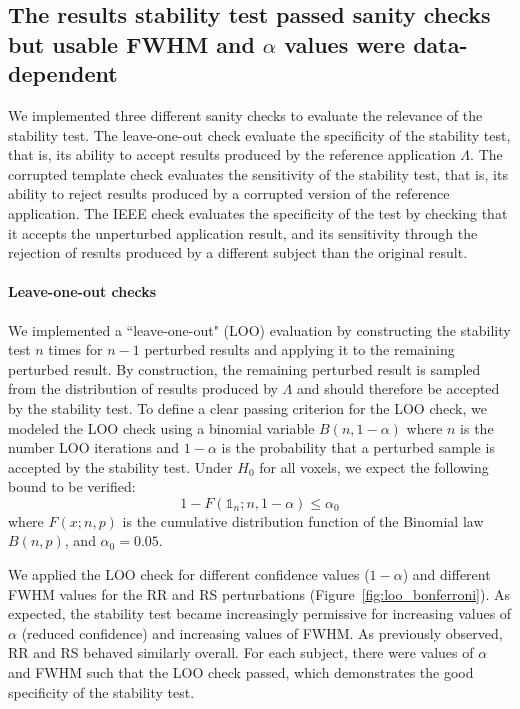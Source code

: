 \documentclass[lettersize,journal]{IEEEtran}
\begin{document}
\subsection{The results stability test passed sanity checks but usable FWHM and $\alpha$ values were data-dependent}

We implemented three different sanity checks to evaluate the relevance of the stability test.
The leave-one-out check evaluate the specificity of the stability test, that is, its ability
to accept results produced by the reference application $\Lambda$. The corrupted template check evaluates
the sensitivity of the stability test, that is, its ability to reject results produced by a corrupted version of the reference application. The IEEE check evaluates the specificity
of the test by checking that it accepts the unperturbed application result, and its sensitivity through the rejection of results produced by a different subject than the original result.

\paragraph{Leave-one-out checks} We implemented a ``leave-one-out" (LOO) evaluation by constructing the stability test $n$ times for $n-1$ perturbed results and applying it to the remaining perturbed result. By construction, the remaining perturbed result is sampled from the distribution of results produced by $\Lambda$ and should therefore be accepted by the stability test.
To define a clear passing criterion for the LOO check, we modeled the LOO check using a binomial variable $B(n,1-\alpha)$ where $n$ is the number LOO iterations and $1-\alpha$ is the probability that a perturbed sample is accepted by the stability test. Under $H_0$ for all voxels, we expect the following bound to be verified:
\[
    1-F(\mathds{1}_n;n,1-\alpha) \leq \alpha_0
\]
where $F(x;n,p)$ is the cumulative distribution function of the Binomial law $B(n,p)$, and $\alpha_0=0.05$.

We applied the LOO check for different confidence values ($1-\alpha$) and different FWHM  values for the RR and RS perturbations (Figure~\ref{fig:loo_bonferroni}). As expected, the stability test became increasingly permissive for increasing values of $\alpha$ (reduced confidence) and increasing values of FWHM. As previously observed, RR and RS behaved similarly overall. For each subject, there were values of $\alpha$ and FWHM such that the LOO check passed, which demonstrates the good specificity of the stability test.
\end{document}
